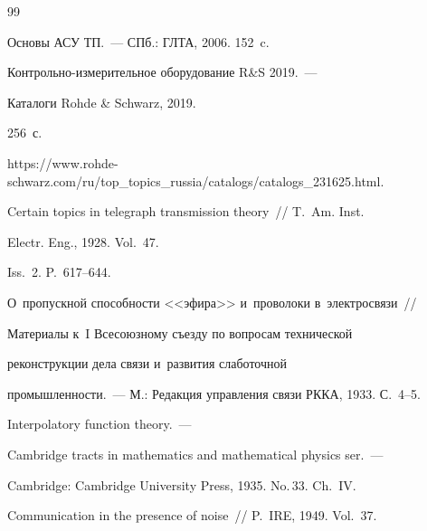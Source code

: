 {\small\frenchspacing


{%




\begin{thebibliography}{99}







 Основы АСУ ТП.~--- СПб.: ГЛТА, 2006. 152~c. 




Контрольно-измерительное оборудование R\&S 2019.~--- 


Каталоги Rohde \& Schwarz, 2019. 


256~с. 


{\sf https://www.rohde-schwarz.com/ru/top\_topics\_russia/\linebreak catalogs/catalogs\_231625.html}.









 Certain topics in telegraph transmission theory~/\!\!/ T.~Am. Inst.


 Electr. Eng., 1928. Vol.~47. 


 Iss.~2. P.~617--644.




 О~пропускной способности <<эфира>> и~проволоки в~электросвязи~/\!\!/ 


Материалы к~I Всесоюзному съезду по вопросам технической 


реконструкции дела связи и~развития слаботочной 


промышленности.~--- М.: Редакция управления связи РККА, 1933. С.~4--5.




 Interpolatory function theory.~--- 


Cambridge tracts in mathematics and mathematical physics ser.~--- 


Cambridge: Cambridge University Press, 1935.  No.\,33. Ch.~IV.







 Communication in the presence of noise~/\!\!/ P.~IRE, 1949. Vol.~37. 



\end{thebibliography}}}
